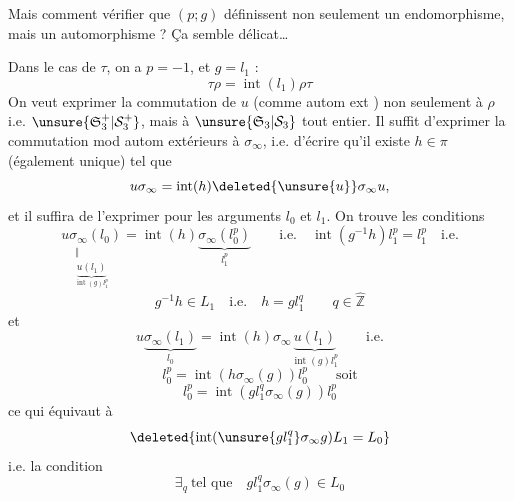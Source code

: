 Mais comment vérifier que $(p;g)$ définissent non seulement un endomorphisme, mais un automorphisme ? Ça semble délicat\ldots

Dans le cas de $\tau$, on a $p=-1$, et $g=l_1$ :
\[
\tau\rho=\operatorname{int}(l_1)\rho\tau
\]
On veut exprimer la commutation de $u$ (comme autom ext ) non seulement à $\rho$ i.e. $\unsure{\mathfrak S_3^+|\mathcal S_3^+}$,
mais à $\unsure{\mathfrak S_3|\mathcal S_3}$ tout entier. Il suffit d'exprimer la commutation mod autom extérieurs à $\sigma_\infty$, i.e. d'écrire qu'il existe $h\in\pi$ (également unique) tel que
\[
u\sigma_\infty=\operatorname{int}(h)\deleted{\unsure{u}}\sigma_\infty u,
\]
et il suffira de l'exprimer pour les arguments $l_0$ et $l_1$. On trouve les conditions
\[
\underset{\substack{\Vert\\\underbrace{u(l_1)}_{\operatorname{int}(g)l_1^p}}}{u\sigma_\infty(l_0)}=\operatorname{int}(h)\underbrace{\sigma_\infty(l_0^p)}_{l_1^p}
\qquad\text{i.e.}\quad\operatorname{int}(g^{-1}h)l_1^p=l_1^p\quad\text{i.e.}
\]
\[
g^{-1}h\in L_1\quad\text{i.e.}\quad h=gl_1^{q}\qquad q\in\hat{\mathbb Z}
\]
et
\[
u\underbrace{\sigma_\infty(l_1)}_{l_0}=\operatorname{int}(h)\sigma_\infty\underbrace{u(l_1)}_{\operatorname{int}(g)l_1^p}\qquad\text{i.e.}
\]
\[
l_0^p=\operatorname{int}(h\sigma_\infty(g))l_0^p\qquad\text{soit}
\]
\[
l_0^p=\operatorname{int}(gl_1^q\sigma_\infty(g))l_0^p
\]
ce qui équivaut à
\[
\deleted{\operatorname{int}(\unsure{gl_1^q}\sigma_\infty g)L_1=L_0}
\]
i.e. la condition
\[
\exists_q\ \text{tel que}\quad gl_1^q\sigma_\infty(g)\in L_0
\]
